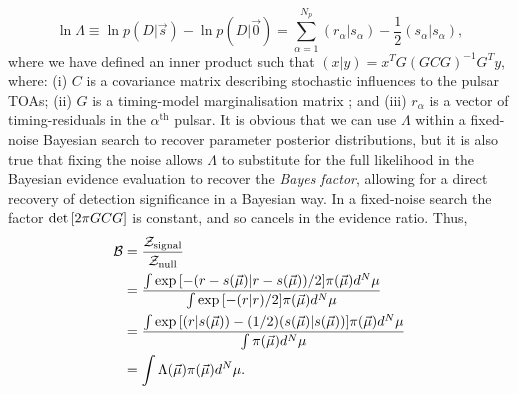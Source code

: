\documentclass[twocolappendix,tighten]{emulateapj}
\begin{document}
\begin{equation} \label{eq:log-like-ratio}
\ln\Lambda \equiv \ln p(D|\vec{s}) - \ln p(D|\vec{0}) = \sum_{\alpha=1}^{N_p} (r_{\alpha}|s_{\alpha}) - \frac{1}{2}(s_{\alpha}|s_{\alpha}),
\end{equation}
where we have defined an inner product such that $(x|y) = x^T G(GCG)^{-1}G^T y$, where: (i) $C$ is a covariance matrix describing stochastic influences to the pulsar TOAs; (ii) $G$ is a timing-model marginalisation matrix \citep{van-haasteren-levin-2012}; and (iii) $r_{\alpha}$ is a vector of timing-residuals in the $\alpha^{\text{th}}$ pulsar. It is obvious that we can use $\Lambda$ within a fixed-noise Bayesian search to recover parameter posterior distributions, but it is also true that fixing the noise allows $\Lambda$ to substitute for the full likelihood in the Bayesian evidence evaluation to recover the {\it Bayes factor}, allowing for a direct recovery of detection significance in a Bayesian way. In a fixed-noise search the factor ${\rm det}\left[2\pi GCG\right]$ is constant, and so cancels in the evidence ratio. Thus,
\begin{align}
\mathcal{B} &= \frac{\mathcal{Z}_{\rm signal}}{\mathcal{Z}_{\rm null}}\nonumber\\
&= \frac{\int\exp{\left[ -(r-s(\vec\mu)|r-s(\vec\mu))/2\right]}\pi(\vec\mu)d^N\mu}{\int\exp{\left[ -(r|r)/2\right]}\pi(\vec\mu)d^N\mu} \\\nonumber
&= \frac{\int \exp{\left[ (r|s(\vec\mu)) - (1/2)(s(\vec\mu)|s(\vec\mu))\right]}\pi(\vec\mu)d^N\mu}{\int\pi(\vec\mu)d^N\mu} \\\nonumber
&= \int \Lambda(\vec\mu)\pi(\vec\mu)d^N\mu.
\end{align}
\end{document}
